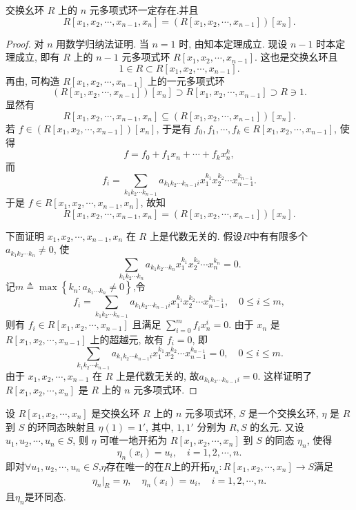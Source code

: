 \documentclass[../../main.tex]{subfiles}%
\begin{document}
\begin{theorem}\label{theorem:任意n元多项式环都可由n-1元的生成}
交换幺环 \( R \) 上的 \( n \) 元多项式环一定存在.并且
\[
R[x_1, x_2, \cdots, x_{n-1}, x_n] = (R[x_1, x_2, \cdots, x_{n-1}])[x_n].
\]
\end{theorem}
\begin{proof}
对 \( n \) 用数学归纳法证明.
当 \( n = 1 \) 时, 由知本定理成立.
现设 \( n-1 \) 时本定理成立, 即有 \( R \) 上的 \( n-1 \) 元多项式环 \( R[x_1, x_2, \cdots, x_{n-1}] \). 这也是交换幺环且
\[
1 \in R \subset R[x_1, x_2, \cdots, x_{n-1}].
\]
再由, 可构造 \( R[x_1, x_2, \cdots, x_{n-1}] \) 上的一元多项式环
\[
(R[x_1, x_2, \cdots, x_{n-1}])[x_n] \supset R[x_1, x_2, \cdots, x_{n-1}] \supset R \ni 1.
\]
显然有
\[
R[x_1, x_2, \cdots, x_{n-1}, x_n] \subseteq (R[x_1, x_2, \cdots, x_{n-1}])[x_n].
\]
若 \( f \in (R[x_1, x_2, \cdots, x_{n-1}])[x_n] \), 于是有 \( f_0, f_1, \cdots, f_k \in R[x_1, x_2, \cdots, x_{n-1}] \), 使得
\[
f = f_0 + f_1 x_n + \cdots + f_k x_n^k,
\]
而
\[
f_i = \sum_{k_1 k_2 \cdots k_{n-1}} a_{k_1 k_2 \cdots k_{n-1} i} x_1^{k_1} x_2^{k_2} \cdots x_{n-1}^{k_{n-1}}.
\]
于是 \( f \in R[x_1, x_2, \cdots, x_{n-1}, x_n] \), 故知
\[
R[x_1, x_2, \cdots, x_{n-1}, x_n] = (R[x_1, x_2, \cdots, x_{n-1}])[x_n].
\]

下面证明 \( x_1, x_2, \cdots, x_{n-1}, x_n \) 在 \( R \) 上是代数无关的. 假设$R$中有有限多个 \( a_{k_1 k_2 \cdots k_n} \ne 0 \), 使
\[
\sum_{k_1 k_2 \cdots k_n} a_{k_1 k_2 \cdots k_n} x_1^{k_1} x_2^{k_2} \cdots x_n^{k_n} = 0.
\]
记$m\triangleq \max \left\{ k_n:a_{k_1\cdots k_n}\ne 0 \right\}$,令
\[
f_i = \sum_{k_1 k_2 \cdots k_{n-1}} a_{k_1 k_2 \cdots k_{n-1} i} x_1^{k_1} x_2^{k_2} \cdots x_{n-1}^{k_{n-1}}, \quad 0 \leqslant i \leqslant m,
\]
则有 \( f_i \in R[x_1, x_2, \cdots, x_{n-1}] \) 且满足 \( \sum_{i=0}^m{f_ix_{n}^{i}}=0 \). 由于 \( x_n \) 是 \( R[x_1, x_2, \cdots, x_{n-1}] \) 上的超越元, 故有 \( f_i = 0 \), 即
\[
\sum_{k_1 k_2 \cdots k_{n-1}} a_{k_1 k_2 \cdots k_{n-1} i} x_1^{k_1} x_2^{k_2} \cdots x_{n-1}^{k_{n-1}} = 0, \quad 0 \leqslant i \leqslant m.
\]
由于 \( x_1, x_2, \cdots, x_{n-1} \) 在 \( R \) 上是代数无关的, 故$a_{k_1 k_2 \cdots k_{n-1} i} = 0.$
这样证明了 \( R[x_1, x_2, \cdots, x_n] \) 是 \( R \) 上的 \( n \) 元多项式环.
\end{proof}

\begin{theorem}\label{theorem:n元多项式环开拓定理}
设 \( R[x_1, x_2, \cdots, x_n] \) 是交换幺环 \( R \) 上的 \( n \) 元多项式环, \( S \) 是一个交换幺环, \( \eta \) 是 \( R \) 到 \( S \) 的环同态映射且 \( \eta(1) = 1' \), 其中, \( 1, 1' \) 分别为 \( R, S \) 的幺元. 又设 \( u_1, u_2, \cdots, u_n \in S \), 则 \( \eta \) 可唯一地开拓为 \( R[x_1, x_2, \cdots, x_n] \) 到 \( S \) 的同态 \( \eta_n \), 使得
\[
\eta_n(x_i) = u_i, \quad i = 1, 2, \cdots, n.
\]
即对$\forall u_1, u_2, \cdots, u_n \in S$,$\eta$存在唯一的在$R$上的开拓$\eta_u:R[x_1,x_2,\cdots,x_n]\to S$满足
\begin{align*}
\eta_n|_{R}=\eta,\quad \eta_n(x_i) = u_i, \quad i = 1, 2, \cdots, n.
\end{align*}
且$\eta_n$是环同态.
\end{theorem}
\end{document}
